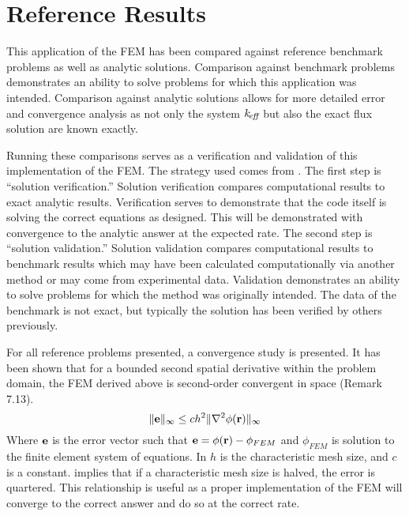 \section{Reference Results}
  This application of the FEM has been compared against reference 
  benchmark problems as well as analytic solutions. Comparison
  against benchmark problems demonstrates an ability to solve problems for
  which this application was intended. Comparison against analytic solutions 
  allows for more detailed error and convergence analysis as not only the system
  $k_{\!\mbox{\scriptsize \em eff}}$ but also the exact flux solution are known exactly. 

  Running these comparisons serves as a verification and validation of this
  implementation of the FEM. The strategy used comes from \cite{oberkampf}. The
  first step is ``solution verification.'' Solution verification compares
  computational results to exact analytic results. Verification serves to
  demonstrate that the code itself is solving the correct equations as designed.
  This will be demonstrated with convergence to the analytic answer at the
  expected rate. The second step is ``solution validation.'' Solution validation
  compares computational results to benchmark results which may have been
  calculated computationally via another method or may come from experimental
  data. Validation demonstrates an ability to solve problems for which the
  method was originally intended. The data of the benchmark is not exact, but
  typically the solution has been verified by others previously.
  
  For all reference problems presented, a convergence study is presented. It has 
  been shown that for a bounded second spatial derivative within the problem 
  domain, the FEM derived above is second-order convergent in space
  \cite{textbookli} (Remark 7.13).
  \begin{equation} \label{eq:error_bound}
    \|\mathbf{e}\|_{\infty} \le c h^2 \| \mathbf{\nabla}^2 \phi(\mathbf{r}) \|_{\infty}
  \end{equation}
  Where $\mathbf{e}$ is the error vector such that $\mathbf{e} = \phi(\mathbf{r}) - \phi_{FEM}$ and
  $\phi_{FEM}$ is solution to the finite element system of equations. In
   $h$ is the characteristic mesh size, and $c$ is a 
  constant.   implies that if a characteristic mesh size is 
  halved, the error is quartered. This relationship is useful as a proper 
  implementation of the FEM will converge to the correct answer and do so at the 
  correct rate.
  
